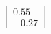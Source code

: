\documentclass[preview]{standalone}
\begin{document}
\begin{align*}
\begin{bmatrix} 0.55 \\ -0.27 \end{bmatrix}
\end{align*}
\end{document}
